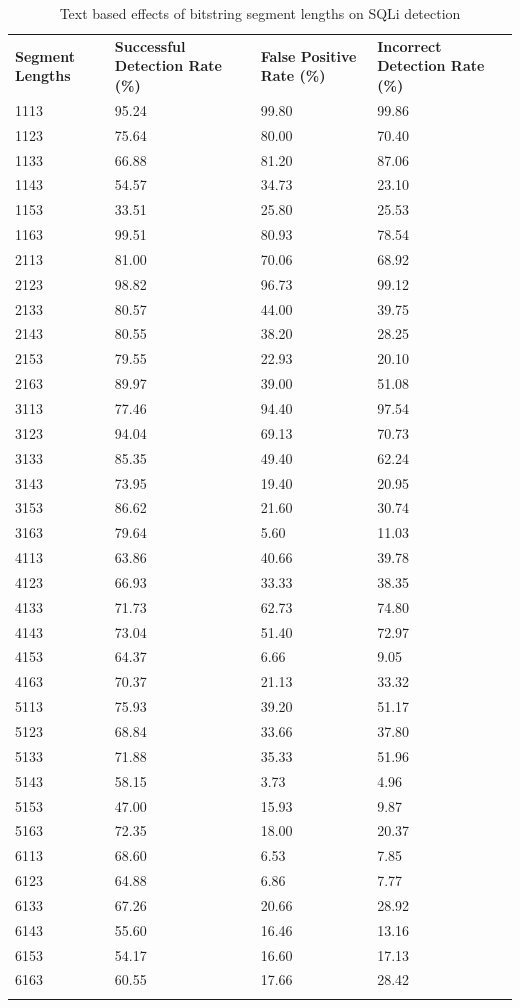 \begin{appendices}
\begin{longtable}{|p{1.5in}|p{1in}|p{1in}|p{1in}|}
	\hline
	\textbf{Segment Lengths} & \textbf{Successful Detection Rate (\%)} & \textbf{False Positive Rate (\%)} & \textbf{Incorrect Detection Rate (\%)}  \\
	\hhline{|=|=|=|=|}
	1113 & 95.24 & 99.80 & 99.86 \\ \hline
	1123 & 75.64 & 80.00 & 70.40 \\ \hline
	1133 & 66.88 & 81.20 & 87.06 \\ \hline
	1143 & 54.57 & 34.73 & 23.10 \\ \hline
	1153 & 33.51 & 25.80 & 25.53 \\ \hline
	1163 & 99.51 & 80.93 & 78.54 \\ \hline
	2113 & 81.00 & 70.06 & 68.92 \\ \hline
	2123 & 98.82 & 96.73 & 99.12 \\ \hline
	2133 & 80.57 & 44.00 & 39.75 \\ \hline
	2143 & 80.55 & 38.20 & 28.25 \\ \hline
	2153 & 79.55 & 22.93 & 20.10 \\ \hline
	2163 & 89.97 & 39.00 & 51.08 \\ \hline
	3113 & 77.46 & 94.40 & 97.54 \\ \hline
	3123 & 94.04 & 69.13 & 70.73 \\ \hline
	3133 & 85.35 & 49.40 & 62.24 \\ \hline
	3143 & 73.95 & 19.40 & 20.95 \\ \hline
	3153 & 86.62 & 21.60 & 30.74 \\ \hline
	3163 & 79.64 &  5.60 & 11.03 \\ \hline
	4113 & 63.86 & 40.66 & 39.78 \\ \hline
	4123 & 66.93 & 33.33 & 38.35 \\ \hline
	4133 & 71.73 & 62.73 & 74.80 \\ \hline
	4143 & 73.04 & 51.40 & 72.97 \\ \hline
	4153 & 64.37 &  6.66 &  9.05 \\ \hline
	4163 & 70.37 & 21.13 & 33.32 \\ \hline
	5113 & 75.93 & 39.20 & 51.17 \\ \hline 
	5123 & 68.84 & 33.66 & 37.80 \\ \hline
	5133 & 71.88 & 35.33 & 51.96 \\ \hline
	5143 & 58.15 &  3.73 &  4.96 \\ \hline
	5153 & 47.00 & 15.93 &  9.87 \\ \hline
	5163 & 72.35 & 18.00 & 20.37 \\ \hline
	6113 & 68.60 &  6.53 &  7.85 \\ \hline
	6123 & 64.88 &  6.86 &  7.77 \\ \hline
	6133 & 67.26 & 20.66 & 28.92 \\ \hline
	6143 & 55.60 & 16.46 & 13.16 \\ \hline
	6153 & 54.17 & 16.60 & 17.13 \\ \hline
	6163 & 60.55 & 17.66 & 28.42 \\ \hline
	\caption{Text based effects of bitstring segment lengths on SQLi detection}
\end{longtable}


\end{appendices}
